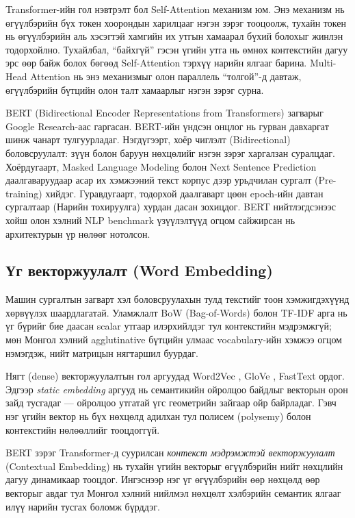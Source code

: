 Transformer-ийн гол нэвтрэлт бол Self-Attention механизм юм. Энэ механизм нь
өгүүлбэрийн бүх токен хоорондын харилцааг нэгэн зэрэг тооцоолж, тухайн токен
нь өгүүлбэрийн аль хэсэгтэй хамгийн их утгын хамаарал бүхий болохыг жинлэн
тодорхойлно. Тухайлбал, ``байхгүй'' гэсэн үгийн утга нь өмнөх контекстийн дагуу
эрс өөр байж болох бөгөөд Self-Attention тэрхүү нарийн ялгааг барина.
Multi-Head Attention нь энэ механизмыг олон параллель ``толгой''-д давтаж,
өгүүлбэрийн бүтцийн олон талт хамаарлыг нэгэн зэрэг сурна.

BERT (Bidirectional Encoder Representations from Transformers) загварыг
\cite{devlin2019} Google Research-аас гаргасан. BERT-ийн үндсэн онцлог нь гурван
давхаргат шинж чанарт тулгуурладаг. Нэгдүгээрт, хоёр чиглэлт (Bidirectional)
боловсруулалт: зүүн болон баруун нөхцөлийг нэгэн зэрэг харгалзан суралцдаг.
Хоёрдугаарт, Masked Language Modeling болон Next Sentence Prediction
даалгаваруудаар асар их хэмжээний текст корпус дээр урьдчилан сургалт
(Pre-training) хийдэг. Гуравдугаарт, тодорхой даалгаварт цөөн epoch-ийн давтан
сургалтаар (Нарийн тохируулга) хурдан дасан зохицдог. BERT нийтлэгдсэнээс хойш олон
хэлний NLP benchmark үзүүлэлтүүд огцом сайжирсан нь архитектурын үр нөлөөг
нотолсон.

\subsection{Үг векторжуулалт (Word Embedding)}
\label{sec:word-embedding}

Машин сургалтын загварт хэл боловсруулахын тулд текстийг тоон хэмжигдэхүүнд
хөрвүүлэх шаардлагатай. Уламжлалт BoW (Bag-of-Words) болон TF-IDF арга нь үг
бүрийг бие даасан scalar утгаар илэрхийлдэг тул контекстийн мэдрэмжгүй; мөн
Монгол хэлний agglutinative бүтцийн улмаас vocabulary-ийн хэмжээ огцом
нэмэгдэж, нийт матрицын нягтаршил буурдаг.

Нягт (dense) векторжуулалтын гол аргуудад Word2Vec \cite{mikolov2013},
GloVe \cite{pennington2014}, FastText \cite{bojanowski2017} ордог.
Эдгээр \textit{static embedding} аргууд нь семантикийн ойролцоо байдлыг
векторын орон зайд тусгадаг --- ойролцоо утгатай үгс геометрийн зайгаар
ойр байрладаг. Гэвч нэг үгийн вектор нь бүх нөхцөлд адилхан тул полисем
(polysemy) болон контекстийн нөлөөллийг тооцдоггүй.

BERT зэрэг Transformer-д суурилсан \textit{контекст мэдрэмжтэй векторжуулалт}
(Contextual Embedding) нь тухайн үгийн векторыг өгүүлбэрийн нийт нөхцлийн
дагуу динамикаар тооцдог. Ингэснээр нэг үг өгүүлбэрийн өөр нөхцөлд өөр
векторыг авдаг тул Монгол хэлний нийлмэл нөхцөлт хэлбэрийн семантик
ялгааг илүү нарийн тусгах боломж бүрддэг.


